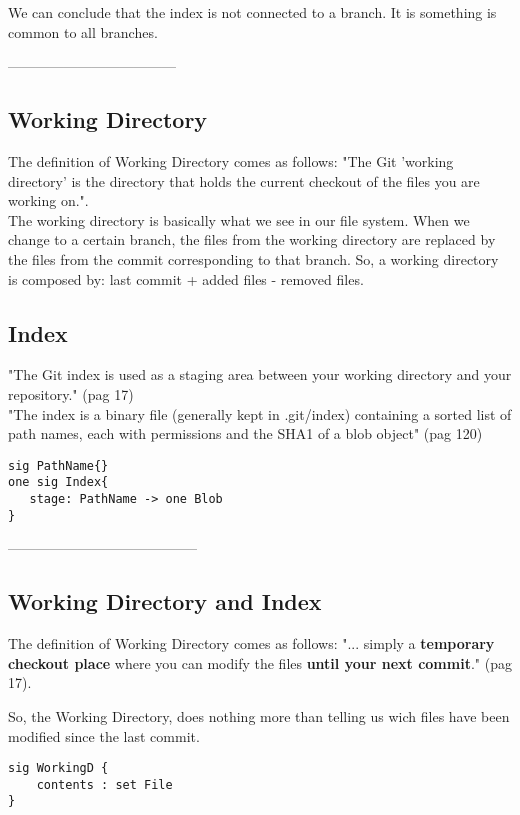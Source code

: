 We can conclude that the index is not connected to a branch. It is something is common to all branches.



------------------------------------
\subsection{Working Directory}
The definition of Working Directory comes as follows:
"The Git 'working directory' is the directory that holds 
the current checkout of the files you are working on.".\\

The working directory is basically what we see in our file 
system. When we change to a certain branch, the files from the 
working directory are replaced by the files from the commit 
corresponding to that branch. So, a working directory is 
composed by: last commit + added files - removed files.\\


\subsection{Index}
"The Git index is used as a staging area between your working directory and your repository." \cite{gitComm} (pag 17)\\
"The index is a binary file (generally kept in .git/index) containing a sorted list of path names, each with permissions and the
SHA1 of a blob object" \cite{gitComm} (pag 120)\\
\begin{lstlisting}
sig PathName{}
one sig Index{
   stage: PathName -> one Blob
}
\end{lstlisting}

-----------------------------------------


\subsection{Working Directory and Index}
The definition of Working Directory comes as follows:
"... simply a {\bf temporary checkout place} where you can 
modify the files {\bf until your next commit}."
\cite{gitComm} (pag 17). \par
So,
the Working Directory, does nothing more than telling
us wich files have been modified since the last commit.

\begin{lstlisting}
sig WorkingD {
	contents : set File
}
\end{lstlisting}

